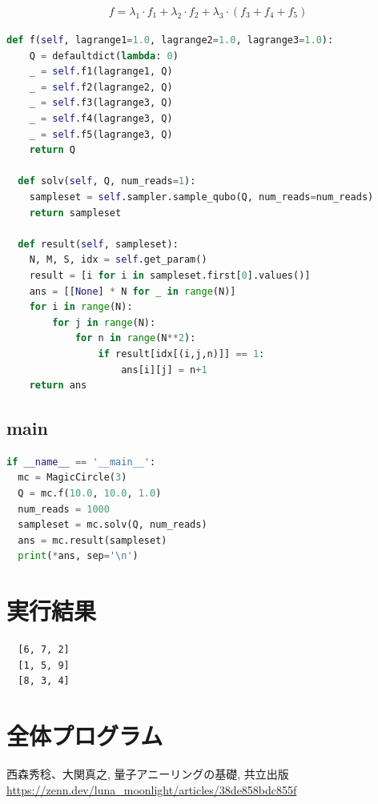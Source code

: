 \documentclass[uplatex,dvipdfmx,a4paper,11pt,oneside,openany]{jsbook}
\begin{document}
\begin{eqnarray*}
  f = \lambda_1\cdot f_1 + \lambda_2\cdot f_2 + \lambda_3\cdot(f_3 + f_4 + f_5)
\end{eqnarray*}

\begin{lstlisting}[language=Python]
  def f(self, lagrange1=1.0, lagrange2=1.0, lagrange3=1.0):
    Q = defaultdict(lambda: 0)
    _ = self.f1(lagrange1, Q)
    _ = self.f2(lagrange2, Q)
    _ = self.f3(lagrange3, Q)
    _ = self.f4(lagrange3, Q)
    _ = self.f5(lagrange3, Q)
    return Q

  def solv(self, Q, num_reads=1):
    sampleset = self.sampler.sample_qubo(Q, num_reads=num_reads)
    return sampleset

  def result(self, sampleset):
    N, M, S, idx = self.get_param()
    result = [i for i in sampleset.first[0].values()]
    ans = [[None] * N for _ in range(N)]
    for i in range(N):
        for j in range(N):
            for n in range(N**2):
                if result[idx[(i,j,n)]] == 1:
                    ans[i][j] = n+1
    return ans
\end{lstlisting}

\subsection{main}

\begin{lstlisting}[language=Python]
if __name__ == '__main__':
  mc = MagicCircle(3)
  Q = mc.f(10.0, 10.0, 1.0)
  num_reads = 1000
  sampleset = mc.solv(Q, num_reads)
  ans = mc.result(sampleset)
  print(*ans, sep='\n')
\end{lstlisting}

\newpage

\section{実行結果}

\begin{verbatim}
  [6, 7, 2]
  [1, 5, 9]
  [8, 3, 4]
\end{verbatim}

\section{全体プログラム}



\begin{thebibliography}{9}
   西森秀稔、大関真之, 量子アニーリングの基礎, 共立出版
   \url{https://zenn.dev/luna_moonlight/articles/38de858bdc855f}
\end{thebibliography}
\end{document}
